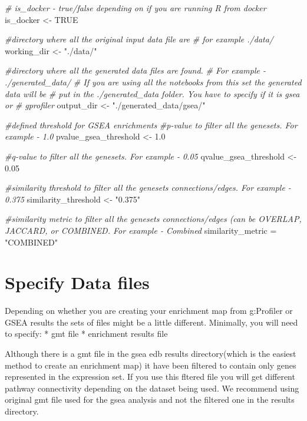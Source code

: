 \documentclass[
]{book}
\newenvironment{Shaded}{\begin{snugshade}}{\end{snugshade}}
\newcommand{\CommentTok}[1]{\textcolor[rgb]{0.56,0.35,0.01}{\textit{#1}}}
\newcommand{\ConstantTok}[1]{\textcolor[rgb]{0.00,0.00,0.00}{#1}}
\newcommand{\FloatTok}[1]{\textcolor[rgb]{0.00,0.00,0.81}{#1}}
\newcommand{\NormalTok}[1]{#1}
\newcommand{\OtherTok}[1]{\textcolor[rgb]{0.56,0.35,0.01}{#1}}
\newcommand{\StringTok}[1]{\textcolor[rgb]{0.31,0.60,0.02}{#1}}
\begin{document}
\begin{Shaded}
\begin{Highlighting}[]
\CommentTok{\# is\_docker {-} true/false depending on if you are running R from docker}
\NormalTok{is\_docker }\OtherTok{\textless{}{-}} \ConstantTok{TRUE}

\CommentTok{\#directory where all the original input data file are}
\CommentTok{\# for example ./data/}
\NormalTok{working\_dir }\OtherTok{\textless{}{-}} \StringTok{"./data/"}


\CommentTok{\#directory where all the generated data files are found.}
\CommentTok{\# For example {-} ./generated\_data/}
\CommentTok{\# If you are using all the notebooks from this set the generated data will be}
\CommentTok{\# put in the ./generated\_data folder.  You have to specify if it is gsea or }
\CommentTok{\# gprofiler}
\NormalTok{output\_dir }\OtherTok{\textless{}{-}} \StringTok{"./generated\_data/gsea/"}


\CommentTok{\#defined threshold for GSEA enrichments }
\CommentTok{\#p{-}value to filter all the genesets.  For example {-}   1.0}
\NormalTok{pvalue\_gsea\_threshold }\OtherTok{\textless{}{-}} \FloatTok{1.0}

\CommentTok{\#q{-}value to filter all the genesets.  For example {-}   0.05}
\NormalTok{qvalue\_gsea\_threshold }\OtherTok{\textless{}{-}} \FloatTok{0.05}

\CommentTok{\#similarity threshold to filter all the genesets connections/edges.  For example {-}   0.375}
\NormalTok{similarity\_threshold }\OtherTok{\textless{}{-}} \StringTok{"0.375"}

\CommentTok{\#similarity metric to filter all the genesets connections/edges (can be OVERLAP, JACCARD, or COMBINED.   For example {-}   Combined}
\NormalTok{similarity\_metric }\OtherTok{=} \StringTok{"COMBINED"}
\end{Highlighting}
\end{Shaded}

\hypertarget{specify-data-files-1}{%
\section{Specify Data files}\label{specify-data-files-1}}

Depending on whether you are creating your enrichment map from g:Profiler or GSEA results the sets of files might be a little different. Minimally, you will need to specify:
* gmt file
* enrichment results file

Although there is a gmt file in the gsea edb results directory(which is the easiest method to create an enrichment map) it have been filtered to contain only genes represented in the expression set. If you use this fltered file you will get different pathway connectivity depending on the dataset being used. We recommend using original gmt file used for the gsea analysis and not the filtered one in the results directory.
\end{document}
